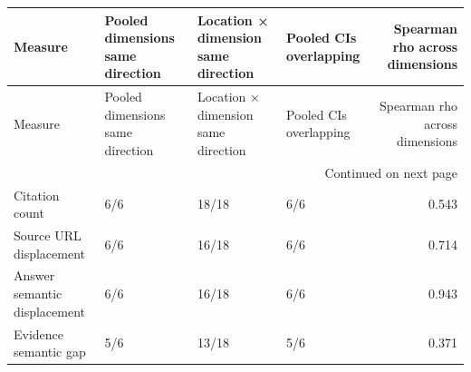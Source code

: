 \begin{longtable}{llllr}
\toprule
Measure & Pooled dimensions same direction & Location × dimension same direction & Pooled CIs overlapping & Spearman rho across dimensions \\
\midrule
\endfirsthead
\toprule
Measure & Pooled dimensions same direction & Location × dimension same direction & Pooled CIs overlapping & Spearman rho across dimensions \\
\midrule
\endhead
\midrule
\multicolumn{5}{r}{Continued on next page} \\
\midrule
\endfoot
\bottomrule
\endlastfoot
Citation count & 6/6 & 18/18 & 6/6 & 0.543 \\
Source URL displacement & 6/6 & 16/18 & 6/6 & 0.714 \\
Answer semantic displacement & 6/6 & 16/18 & 6/6 & 0.943 \\
Evidence semantic gap & 5/6 & 13/18 & 5/6 & 0.371 \\
\end{longtable}
